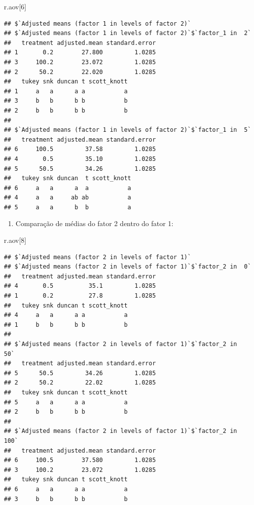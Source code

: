\documentclass[
]{article}
\newenvironment{Shaded}{\begin{snugshade}}{\end{snugshade}}
\newcommand{\DecValTok}[1]{\textcolor[rgb]{0.00,0.00,0.81}{#1}}
\newcommand{\NormalTok}[1]{#1}
\providecommand{\tightlist}{%
  \setlength{\itemsep}{0pt}\setlength{\parskip}{0pt}}
\begin{document}
\begin{Shaded}
\begin{Highlighting}[]
\NormalTok{r.aov[}\DecValTok{6}\NormalTok{]}
\end{Highlighting}
\end{Shaded}

\begin{verbatim}
## $`Adjusted means (factor 1 in levels of factor 2)`
## $`Adjusted means (factor 1 in levels of factor 2)`$`factor_1 in  2`
##   treatment adjusted.mean standard.error
## 1       0.2        27.800         1.0285
## 3     100.2        23.072         1.0285
## 2      50.2        22.020         1.0285
##   tukey snk duncan t scott_knott
## 1     a   a      a a           a
## 3     b   b      b b           b
## 2     b   b      b b           b
## 
## $`Adjusted means (factor 1 in levels of factor 2)`$`factor_1 in  5`
##   treatment adjusted.mean standard.error
## 6     100.5         37.58         1.0285
## 4       0.5         35.10         1.0285
## 5      50.5         34.26         1.0285
##   tukey snk duncan  t scott_knott
## 6     a   a      a  a           a
## 4     a   a     ab ab           a
## 5     a   a      b  b           a
\end{verbatim}

\begin{enumerate}
\def\labelenumi{\arabic{enumi}.}
\setcounter{enumi}{1}
\tightlist
\item
  Comparação de médias do fator 2 dentro do fator 1:
\end{enumerate}

\begin{Shaded}
\begin{Highlighting}[]
\NormalTok{r.aov[}\DecValTok{8}\NormalTok{]}
\end{Highlighting}
\end{Shaded}

\begin{verbatim}
## $`Adjusted means (factor 2 in levels of factor 1)`
## $`Adjusted means (factor 2 in levels of factor 1)`$`factor_2 in  0`
##   treatment adjusted.mean standard.error
## 4       0.5          35.1         1.0285
## 1       0.2          27.8         1.0285
##   tukey snk duncan t scott_knott
## 4     a   a      a a           a
## 1     b   b      b b           b
## 
## $`Adjusted means (factor 2 in levels of factor 1)`$`factor_2 in  50`
##   treatment adjusted.mean standard.error
## 5      50.5         34.26         1.0285
## 2      50.2         22.02         1.0285
##   tukey snk duncan t scott_knott
## 5     a   a      a a           a
## 2     b   b      b b           b
## 
## $`Adjusted means (factor 2 in levels of factor 1)`$`factor_2 in  100`
##   treatment adjusted.mean standard.error
## 6     100.5        37.580         1.0285
## 3     100.2        23.072         1.0285
##   tukey snk duncan t scott_knott
## 6     a   a      a a           a
## 3     b   b      b b           b
\end{verbatim}
\end{document}
